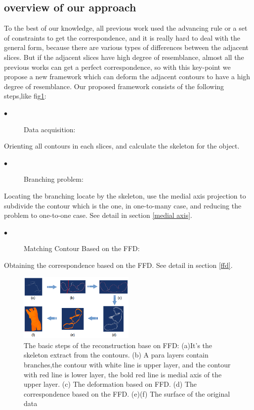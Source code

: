\documentclass[3p,times]{elsarticle}
\begin{document}
\subsection{overview of our approach}
To the best of our knowledge, all previous work used the
advancing rule or a set of constraints to get the correspondence, and
it is really hard to deal with the general form, because there are
various types of differences between the adjacent slices. But if the adjacent
slices have high degree of resemblance, almost all the previous works can get a
perfect correspondence, so with this key-point we propose a new
framework which can deform the adjacent contours to have a high degree
of resemblance.
Our proposed framework consists of the following steps,like fig\ref{fig:fluent}:
\begin{description}
\item[$\bullet$]Data acquisition:
\end{description}
Orienting all contours in each slices, and calculate the skeleton for the object.
\begin{description}
\item[$\bullet$]Branching problem:
\end{description}
Locating the branching locate by the skeleton, use the medial axis
projection to subdivide the contour which is the one, in one-to-many
case, and reducing the problem to one-to-one case. See detail in
section \ref{medial axis}.
\begin{description}
\item[$\bullet$]Matching Contour Based on the FFD:
\end{description}
Obtaining the correspondence based on the FFD. See detail in section \ref{ffd}.
\begin{figure}[ht]
\centering
\includegraphics[width=0.5\textwidth]{../picture/fluent.png}
\caption{The basic steps of the reconstruction base on FFD: (a)It's
  the skeleton extract from the contours. (b) A para layers contain
  branches,the contour with white line is upper layer, and the contour
  with red line is lower layer, the bold red line is medial axis of
  the upper layer. (c) The deformation
  based on FFD. (d) The correspondence based on the FFD. (e)(f) The
  surface of the original data}
\label{fig:fluent}
\end{figure}
\end{document}
